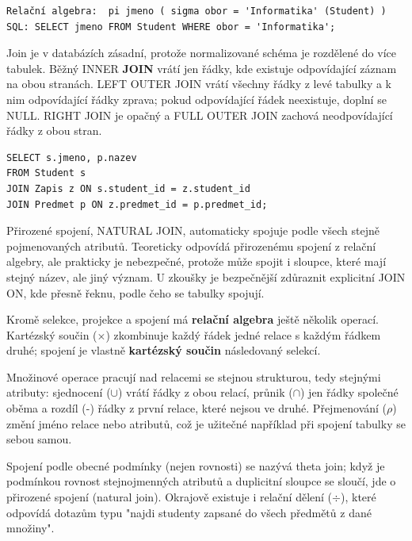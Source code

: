 \documentclass[11pt,a4paper]{article}
\begin{document}
\begin{codebox}
\small
\begin{verbatim}
Relační algebra:  pi jmeno ( sigma obor = 'Informatika' (Student) )
SQL: SELECT jmeno FROM Student WHERE obor = 'Informatika';
\end{verbatim}
\end{codebox}

Join je v databázích zásadní, protože normalizované schéma je rozdělené do více tabulek. Běžný INNER \textbf{JOIN} vrátí jen řádky, kde existuje odpovídající záznam na obou stranách. LEFT OUTER JOIN vrátí všechny řádky z levé tabulky a k nim odpovídající řádky zprava; pokud odpovídající řádek neexistuje, doplní se NULL. RIGHT JOIN je opačný a FULL OUTER JOIN zachová neodpovídající řádky z obou stran.

\begin{codebox}
\small
\begin{verbatim}
SELECT s.jmeno, p.nazev
FROM Student s
JOIN Zapis z ON s.student_id = z.student_id
JOIN Predmet p ON z.predmet_id = p.predmet_id;
\end{verbatim}
\end{codebox}

Přirozené spojení, NATURAL JOIN, automaticky spojuje podle všech stejně pojmenovaných atributů. Teoreticky odpovídá přirozenému spojení z relační algebry, ale prakticky je nebezpečné, protože může spojit i sloupce, které mají stejný název, ale jiný význam. U zkoušky je bezpečnější zdůraznit explicitní JOIN ON, kde přesně řeknu, podle čeho se tabulky spojují.

Kromě selekce, projekce a spojení má \textbf{relační algebra} ještě několik operací. Kartézský součin ($\times$) zkombinuje každý řádek jedné relace s každým řádkem druhé; spojení je vlastně \textbf{kartézský součin} následovaný selekcí.

Množinové operace pracují nad relacemi se stejnou strukturou, tedy stejnými atributy: sjednocení ($\cup$) vrátí řádky z obou relací, průnik ($\cap$) jen řádky společné oběma a rozdíl (-) řádky z první relace, které nejsou ve druhé. Přejmenování ($\rho$) změní jméno relace nebo atributů, což je užitečné například při spojení tabulky se sebou samou.

Spojení podle obecné podmínky (nejen rovnosti) se nazývá theta join; když je podmínkou rovnost stejnojmenných atributů a duplicitní sloupce se sloučí, jde o přirozené spojení (natural join). Okrajově existuje i relační dělení ($\div$), které odpovídá dotazům typu "najdi studenty zapsané do všech předmětů z dané množiny".
\end{document}
